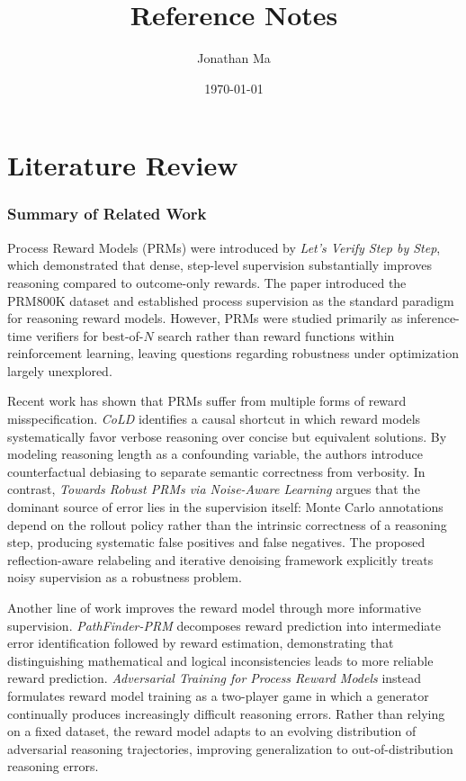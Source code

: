 \documentclass[11pt]{article}
\title{\textbf{Reference Notes}}
\author{Jonathan Ma}
\date{\today}
\begin{document}
\maketitle
\tableofcontents
\newpage

\part{Literature Review}

\section{Summary of Related Work}

Process Reward Models (PRMs) were introduced by \emph{Let's Verify Step by Step}, which demonstrated that dense, step-level supervision substantially improves reasoning compared to outcome-only rewards. The paper introduced the PRM800K dataset and established process supervision as the standard paradigm for reasoning reward models. However, PRMs were studied primarily as inference-time verifiers for best-of-$N$ search rather than reward functions within reinforcement learning, leaving questions regarding robustness under optimization largely unexplored. 

Recent work has shown that PRMs suffer from multiple forms of reward misspecification. \emph{CoLD} identifies a causal shortcut in which reward models systematically favor verbose reasoning over concise but equivalent solutions. By modeling reasoning length as a confounding variable, the authors introduce counterfactual debiasing to separate semantic correctness from verbosity. In contrast, \emph{Towards Robust PRMs via Noise-Aware Learning} argues that the dominant source of error lies in the supervision itself: Monte Carlo annotations depend on the rollout policy rather than the intrinsic correctness of a reasoning step, producing systematic false positives and false negatives. The proposed reflection-aware relabeling and iterative denoising framework explicitly treats noisy supervision as a robustness problem. 

Another line of work improves the reward model through more informative supervision. \emph{PathFinder-PRM} decomposes reward prediction into intermediate error identification followed by reward estimation, demonstrating that distinguishing mathematical and logical inconsistencies leads to more reliable reward prediction. \emph{Adversarial Training for Process Reward Models} instead formulates reward model training as a two-player game in which a generator continually produces increasingly difficult reasoning errors. Rather than relying on a fixed dataset, the reward model adapts to an evolving distribution of adversarial reasoning trajectories, improving generalization to out-of-distribution reasoning errors.  
\end{document}
